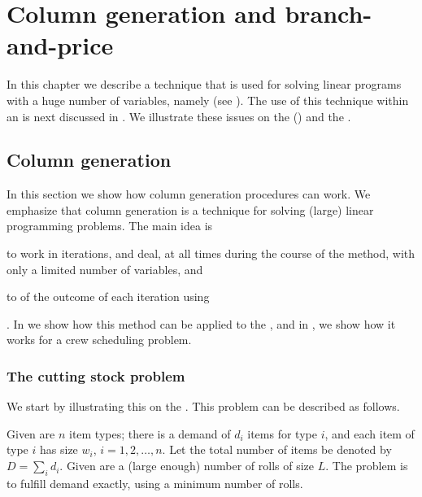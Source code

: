 \chapter{Column generation and branch-and-price}

In this chapter we describe a technique that is used for solving linear programs with a huge number of variables, namely  (see ). The use of this technique within an  is next discussed in . We illustrate these issues on the  () and the .

\section{Column generation}

In this section we show how column generation procedures can work. We emphasize that column generation is a technique for solving (large) linear programming problems. The main idea is \begin{inlineenumerate}\item to work in iterations, and deal, at all times during the course of the method, with only a limited number of variables, and \item to  of the outcome of each iteration using \end{inlineenumerate}. In  we show how this method can be applied to the , and in , we show how it works for a crew scheduling problem.

\subsection{The cutting stock problem}

We start by illustrating this on the . This problem can be described as follows.
\begin{definition}
Given are $n$ item types; there is a demand of $d_i$ items for type $i$, and each item of type $i$ has size $w_i$, $i=1,2,\ldots,n$. Let the total number of items be denoted by $D=\sum_i d_i$. Given are a (large enough) number of rolls of size $L$. The problem is to fulfill demand exactly, using a minimum number of rolls.
\end{definition}

